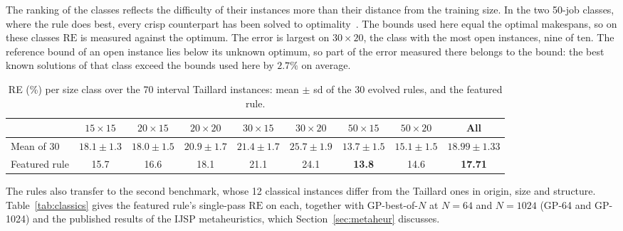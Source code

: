 \documentclass[review,authoryear,11pt]{elsarticle}
\newcommand{\RE}{\mathrm{RE}}
\begin{document}
The ranking of the classes reflects the difficulty of their instances
more than their distance from the training size. In the two 50-job
classes, where the rule does best, every crisp counterpart has been
solved to optimality~\citep{CoupventdesGraviers2025}. The bounds used
here equal the optimal makespans, so on these classes $\RE$ is measured
against the optimum. The error is largest on
$30{\times}20$, the class with the most open instances, nine of ten.
The reference bound of an open instance lies below its unknown optimum,
so part of the error measured there belongs to the bound: the best known
solutions of that class exceed the bounds used here by $2.7\%$ on
average.

\begin{table}[t]
\centering\small
\caption{RE (\%) per size class over the 70 interval Taillard instances: mean
$\pm$ sd of the 30 evolved rules, and the featured rule.}
\label{tab:gp70}
\setlength{\tabcolsep}{2.2pt}
\scriptsize
\begin{tabular}{lccccccc|c}
\toprule
& $15{\times}15$ & $20{\times}15$ & $20{\times}20$ &
$30{\times}15$ & $30{\times}20$ & $50{\times}15$ & $50{\times}20$ & All \\
\midrule
Mean of 30 & $18.1{\pm}1.3$ & $18.0{\pm}1.5$ & $20.9{\pm}1.7$ &
$21.4{\pm}1.7$ & $25.7{\pm}1.9$ & $13.7{\pm}1.5$ & $15.1{\pm}1.5$ &
$18.99{\pm}1.33$ \\
Featured rule & 15.7 & 16.6 & 18.1 & 21.1 & 24.1 & \textbf{13.8} & 14.6 &
\textbf{17.71} \\
\bottomrule
\end{tabular}
\end{table}


The rules also transfer to the second benchmark, whose 12 classical
instances differ from the Taillard ones in origin, size and
structure.
Table~\ref{tab:classics} gives the featured rule's single-pass $\RE$ on
each, together with GP-best-of-$N$ at $N = 64$ and $N = 1024$ (GP-64 and
GP-1024) and the
published results of the IJSP metaheuristics, which
Section~\ref{sec:metaheur} discusses.
\end{document}
